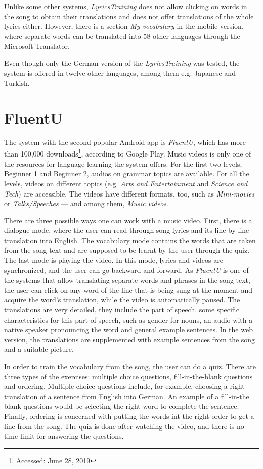 Unlike some other systems, \textit{LyricsTraining} does not allow clicking on words in the song to obtain their translations and does not offer translations of the whole lyrics either. However, there is a section \textit{My vocabulary }in the mobile version, where separate words can be translated into 58 other languages through the Microsoft Translator.

Even though only the German version of the \textit{LyricsTraining} was tested, the system is offered in twelve other languages, among them e.g. Japanese and Turkish.

\section{FluentU}

The system with the second popular Android app is \textit{FluentU}, which has more than 100,000 downloads\footnote{Accessed: June 28, 2019}, according to Google Play. Music videos is only one of the resources for language learning the system offers. For the first two levels, Beginner 1 and Beginner 2, audios on grammar topics are available. For all the levels, videos on different topics (e.g. \textit{Arts and Entertainment} and \textit{Science and Tech}) are accessible. The videos have different formats, too, such as \textit{Mini-movies} or \textit{Talks/Speeches} --- and among them, \textit{Music videos}.

There are three possible ways one can work with a music video. First, there is a dialogue mode, where the user can read through song lyrics and its line-by-line translation into English. The vocabulary mode contains the words that are taken from the song text and are supposed to be learnt by the user through the quiz. The last mode is playing the video. In this mode, lyrics and videos are synchronized, and the user can go backward and forward. As \textit{FluentU} is one of the systems that allow translating separate words and phrases in the song text, the user can click on any word of the line that is being sung at the moment and acquire the word's translation, while the video is automatically paused. The translations are very detailed, they include the part of speech, some specific characteristics for this part of speech, such as gender for nouns, an audio with a native speaker pronouncing the word and general example sentences. In the web version, the translations are supplemented with example sentences from the song and a suitable picture. 

In order to train the vocabulary from the song, the user can do a quiz. There are three types of the exercises: multiple choice questions, fill-in-the-blank questions and ordering. Multiple choice questions include, for example, choosing a right translation of a sentence from English into German. An example of a fill-in-the blank questions would be selecting the right word to complete the sentence. Finally, ordering is concerned with putting the words int the right order to get a line from the song. The quiz is done after watching the video, and there is no time limit for answering the questions.

